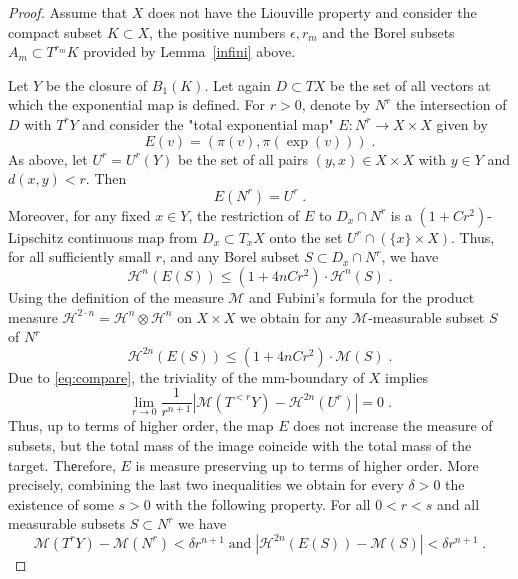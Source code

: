 \documentclass[12pt,leqno,intlimits]{amsart}
\numberwithin{equation}{section}
\theoremstyle{definition}
\theoremstyle{remark}
\newcommand{\lref}[1]{Lemma~\ref{#1}}
\def\:{\colon}
\begin{document}
\begin{proof}
Assume that $X$ does not have the Liouville property and consider the compact subset $K \subset X$, the positive numbers $\epsilon, r_m$ and the Borel
subsets $A_m\subset T^{r_m} K$ provided by \lref{infini} above.

Let $Y$ be the closure of $B_1 (K)$.
Let again $D\subset TX$ be the set of all vectors at which the exponential map is defined.
  For $r>0$, denote  by $N^r$ the intersection of $D$ with $T^r Y$ and consider the "total exponential map"
$E\:N^r \to X\times X$ given by $$E(v)= (\pi (v), \pi (\exp (v))) \; .$$
 As above,  let $U^r =U^r(Y)$ be  the set of all
  pairs $(y,x) \in X\times X$ with $y\in Y$ and $d(x,y)<r$. Then
\begin{equation} \label{eq:image}
E(N^r) =U^r \; .
\end{equation}
Moreover, for any  fixed $x \in Y$, the restriction of $E$ to $D_x \cap N^r$ is
a $(1+ C r^2)$-Lipschitz continuous map from $D_x\subset T_xX$ onto the set  $U^r \cap (\{x \} \times X)$.
Thus, for all sufficiently small $r$, and any Borel subset $S\subset D_x \cap N^r$, we have
$$\mathcal H^n (E(S)) \leq (1+4n C r^2)\cdot  \mathcal H^n (S)\; .$$
 Using the definition of the measure $\mathcal M$ and  Fubini's formula for the product measure
$\mathcal H^{2\cdot n} =\mathcal H^n \otimes \mathcal H^n $ on $X\times X$ we obtain for any $\mathcal M$-measurable subset $S$ of $N^r$
\begin{equation} \label{eq:contract}
\mathcal H^{2n} (E(S)) \leq (1+4nC r^2) \cdot \mathcal M(S)\; .
\end{equation}
Due to \eqref{eq:compare}, the triviality of the mm-boundary of $X$ implies
$$\lim _{r\to 0} \frac 1 {r^{n+1} } |\mathcal M(T^{<r} Y) -\mathcal H^{2n} (U^r)| =0 \;.$$
 Thus, up to terms of higher order, the  map $E$ does not increase the measure of subsets, but the total mass of the image
coincide with the total mass of the target.
Thеrefore, $E$ is measure preserving up to terms of higher order.
More precisely,   combining the last two inequalities we obtain for every  $\delta >0$ the existence of some $s>0$ with the following property. For all $0<r<s$ and all measurable subsets $S\subset N^r$
	we have
	\begin{equation}  \label{eq:almostall}
	\mathcal M (T^r Y)- \mathcal M (N^r) < \delta r^{n+1} \;   \text{and}  \;   |\mathcal H^{2n} (E(S)) - \mathcal M  (S)|  < \delta r^{n+1} \;.
	\end{equation}

\end{proof}
\end{document}
